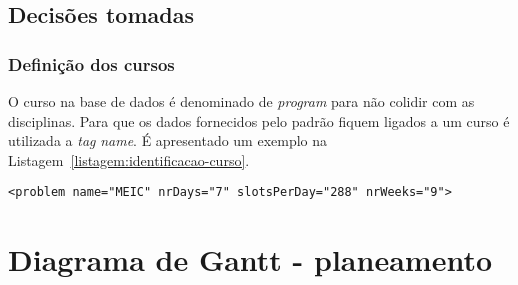 \subsection{Decisões tomadas}

\subsubsection{Definição dos cursos}

O curso na base de dados é denominado de \textit{program} para não colidir com as disciplinas. Para que os dados fornecidos pelo padrão fiquem ligados a um curso é utilizada a \textit{tag} \textit{name}. É apresentado um exemplo na Listagem~\ref{listagem:identificacao-curso}.

\begin{minipage}[c]{\linewidth}
\begin{lstlisting}[caption={Exemplo da identificação do curso.}, label={listagem:identificacao-curso}]
<problem name="MEIC" nrDays="7" slotsPerDay="288" nrWeeks="9">
\end{lstlisting}
\end{minipage}









\section{Diagrama de Gantt - planeamento}
\label{capitulo3:Diagrama-gantt}


